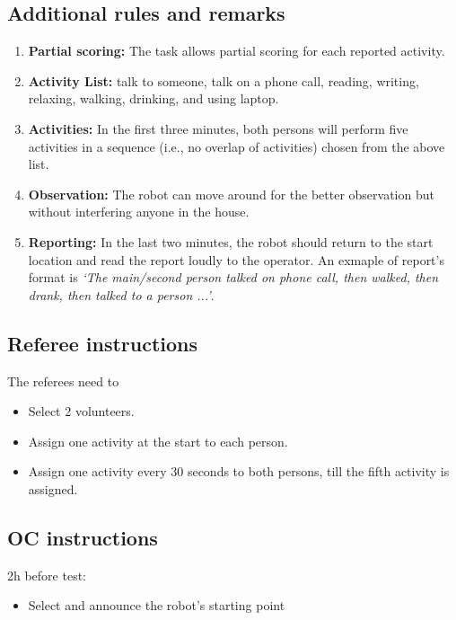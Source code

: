 \subsection{Additional rules and remarks}
\begin{enumerate}[nosep]
	\item \textbf{Partial scoring:} The task allows partial scoring for each reported activity.
	
	\item \textbf{Activity List:} talk to someone, talk on a phone call, reading, writing, relaxing, walking, drinking, and using laptop.
	
	\item \textbf{Activities:}  In the first three minutes, both persons will perform five activities in a sequence (i.e., no overlap of activities) chosen from the above list.
	
	\item \textbf{Observation:} The robot can move around for the better observation but without interfering anyone in the house.
	
	\item \textbf{Reporting:} In the last two minutes, the robot should return to the start location and read the report loudly to the operator. An exmaple of report's format is \textit{`The main/second person talked on phone call, then walked, then drank, then talked to a person ...'}.
	
\end{enumerate}


\subsection{Referee instructions}

The referees need to
\begin{itemize}
	\item Select 2 volunteers.
	\item Assign one activity at the start to each person.
	\item Assign one activity every 30 seconds to both persons, till the fifth activity is assigned.
\end{itemize}

\subsection{OC instructions}

2h before test:
\begin{itemize}
	\item Select and announce the robot's starting point
\end{itemize}

% 
